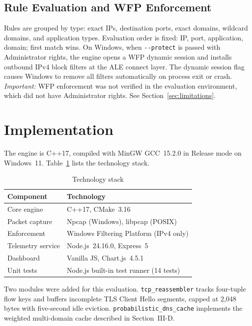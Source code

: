 \documentclass[conference]{IEEEtran}
\begin{document}
\subsection{Rule Evaluation and WFP Enforcement}

Rules are grouped by type: exact IPs, destination ports, exact domains,
wildcard domains, and application types.
Evaluation order is fixed: IP, port, application, domain; first match wins.
On Windows, when \texttt{-{}-protect} is passed with Administrator rights,
the engine opens a WFP dynamic session and installs outbound IPv4 block
filters at the ALE connect layer.
The dynamic session flag causes Windows to remove all filters
automatically on process exit or crash.
\emph{Important:} WFP enforcement was not verified in the evaluation
environment, which did not have Administrator rights.  See
Section~\ref{sec:limitations}.

\section{Implementation}

The engine is C++17, compiled with MinGW GCC~15.2.0 in Release mode
on Windows~11.  Table~\ref{tab:stack} lists the technology stack.

\begin{table}[!t]
\centering
\caption{Technology stack}
\label{tab:stack}
\scriptsize
\begin{tabular}{|l|l|}
\hline
\textbf{Component} & \textbf{Technology} \\
\hline
Core engine & C++17, CMake~3.16 \\
\hline
Packet capture & Npcap (Windows), libpcap (POSIX) \\
\hline
Enforcement & Windows Filtering Platform (IPv4 only) \\
\hline
Telemetry service & Node.js~24.16.0, Express~5 \\
\hline
Dashboard & Vanilla JS, Chart.js~4.5.1 \\
\hline
Unit tests & Node.js built-in test runner (14 tests) \\
\hline
\end{tabular}
\end{table}

Two modules were added for this evaluation.
\texttt{tcp\_reassembler} tracks four-tuple flow keys and buffers
incomplete TLS Client Hello segments, capped at 2{,}048 bytes
with five-second idle eviction.
\texttt{probabilistic\_dns\_cache} implements the weighted
multi-domain cache described in Section~III-D.
\end{document}
